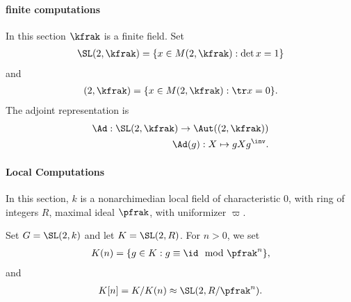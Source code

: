 \paragraph{finite computations}
In this section $\kfrak$ is a finite field. Set
\begin{align*}
    \SL(2,\kfrak) = \{ x \in M(2,\kfrak) : \det x =1 \}
\end{align*}
and
\begin{align*}
    \sl(2,\kfrak) = \{ x \in M(2,\kfrak) : \tr x = 0 \}.
\end{align*}
The adjoint representation is
\begin{align*}
    \Ad : \SL(2,\kfrak) \to \Aut(\sl(2,\kfrak)) \\
    \Ad(g):  X \mapsto  g X g^\inv.
\end{align*}

\paragraph{Local Computations}
In this section, $k$ is a nonarchimedian local field of characteristic $0$, with ring of integers $R$, maximal ideal $\pfrak$, with uniformizer $\varpi$.

Set $G = \SL(2,k)$ and let $K = \SL(2,R)$. For $n>0$, we set
\begin{align*}
    K(n) = \{ g \in K : g \equiv \id \mod \pfrak^n\},
\end{align*}
and
\begin{align*}
    K[n] = K/K(n) \approx \SL(2,R/\pfrak^n).
\end{align*}
\cite{leiningerLengthEigenvalueEquivalence2007}
\cite{voightQuaternionAlgebras2021}

